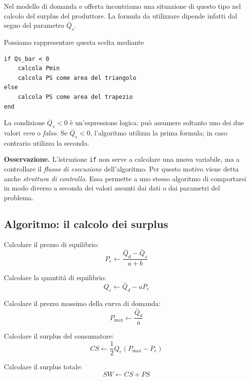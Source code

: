 Nel modello di domanda e offerta incontriamo una situazione di
questo tipo nel calcolo del surplus del produttore. La formula da
utilizzare dipende infatti dal segno del parametro $\bar Q_s$.

Possiamo rappresentare questa scelta mediante
\begin{verbatim}
if Qs_bar < 0
    calcola Pmin
    calcola PS come area del triangolo
else
    calcola PS come area del trapezio
end
\end{verbatim}
La condizione $\bar Q_s < 0$
è un'espressione logica: può assumere soltanto uno dei due valori
\emph{vero} o \emph{falso}. Se $\bar Q_s<0$, l'algoritmo utilizza
la prima formula; in caso contrario utilizza la seconda.

\noindent
\textbf{Osservazione.}
L'istruzione \texttt{if} non serve a calcolare una nuova variabile,
ma a controllare il \emph{flusso di esecuzione} dell'algoritmo.
Per questo motivo viene detta anche \emph{struttura di controllo}.
Essa permette a uno stesso algoritmo di comportarsi in modo diverso
a seconda dei valori assunti dai dati o dai parametri del problema.

\newpage

\subsection{Algoritmo: il calcolo dei surplus}

\begin{algorithm}[H]
\caption{Calcolo dell'equilibrio e dei surplus}


Calcolare il prezzo di equilibrio:
\[
P_e \leftarrow \frac{\bar Q_d-\bar Q_s}{a+b}
\]

Calcolare la quantità di equilibrio:
\[
Q_e \leftarrow \bar Q_d-aP_e
\]

Calcolare il prezzo massimo della curva di domanda:
\[
P_{\max} \leftarrow \frac{\bar Q_d}{a}
\]

Calcolare il surplus del consumatore:
\[
CS \leftarrow \frac{1}{2}Q_e(P_{\max}-P_e)
\]


Calcolare il surplus totale:
\[
SW \leftarrow CS+PS
\]


\end{algorithm}

